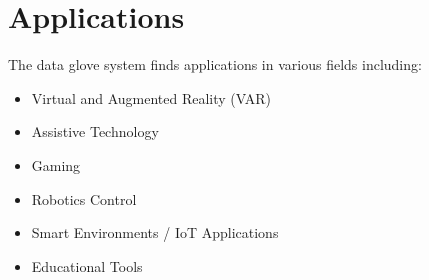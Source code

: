 \section{Applications}
The data glove system finds applications in various fields including:
\begin{itemize}
    \item Virtual and Augmented Reality (VAR)
    \item Assistive Technology
    \item Gaming
    \item Robotics Control
    \item Smart Environments / IoT Applications
    \item Educational Tools
\end{itemize}


